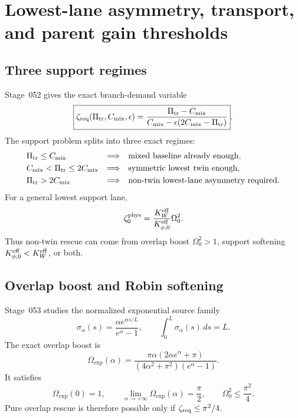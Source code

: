 \section{Lowest-lane asymmetry, transport, and parent gain thresholds}
\label{sec:part03_support_family1:lowest-lane-asymmetry-and-gain-thresholds}

\subsection{Three support regimes}
\label{subsec:part03-support-regimes}

Stage~052 gives the exact branch-demand variable
\begin{equation}
\label{eq:part03-zeta-req-product}
\boxed{
\zeta_{\rm req}(\Pi_{\rm tr},C_{\rm mix},\epsilon)
=\frac{\Pi_{\rm tr}-C_{\rm mix}}
{C_{\rm mix}-\epsilon(2C_{\rm mix}-\Pi_{\rm tr})}}.
\end{equation}
The support problem splits into three exact regimes:
\begin{equation}
\label{eq:part03-three-regimes}
\begin{array}{lll}
\Pi_{\rm tr}\leq C_{\rm mix} &\Longrightarrow& \text{mixed baseline already enough},\\[0.3em]
C_{\rm mix}<\Pi_{\rm tr}\leq2C_{\rm mix} &\Longrightarrow& \text{symmetric lowest twin enough},\\[0.3em]
\Pi_{\rm tr}>2C_{\rm mix} &\Longrightarrow& \text{non-twin lowest-lane asymmetry required}.
\end{array}
\end{equation}
For a general lowest support lane,
\begin{equation}
\label{eq:part03-zeta0-phys}
\zeta_0^{\rm phys}=\frac{K_W^{\rm eff}}{K_{\phi,0}^{\rm eff}}\Omega_0^2.
\end{equation}
Thus non-twin rescue can come from overlap boost \(\Omega_0^2>1\), support softening \(K_{\phi,0}^{\rm eff}<K_W^{\rm eff}\), or both.

\subsection{Overlap boost and Robin softening}
\label{subsec:part03-overlap-robin}

Stage~053 studies the normalized exponential source family
\begin{equation}
\label{eq:part03-sigma-alpha}
\sigma_\alpha(s)=\frac{\alpha e^{\alpha s/L}}{e^\alpha-1},
\qquad
\int_0^L\sigma_\alpha(s)\,ds=L.
\end{equation}
The exact overlap boost is
\begin{equation}
\label{eq:part03-Omega-exp}
\boxed{
\Omega_{\exp}(\alpha)=
\frac{\pi\alpha\left(2\alpha e^\alpha+\pi\right)}{(4\alpha^2+\pi^2)(e^\alpha-1)}}.
\end{equation}
It satisfies
\begin{equation}
\label{eq:part03-Omega-exp-window}
\Omega_{\exp}(0)=1,
\qquad
\lim_{\alpha\to+\infty}\Omega_{\exp}(\alpha)=\frac{\pi}{2},
\qquad
\Omega_0^2\leq\frac{\pi^2}{4}.
\end{equation}
Pure overlap rescue is therefore possible only if \(\zeta_{\rm req}\leq\pi^2/4\).

